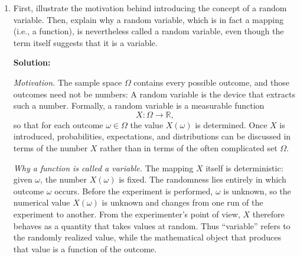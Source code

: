 \documentclass[11pt]{article}
\begin{document}
\noindent
{}

\vspace{1.2em}

\begin{enumerate}[label=\arabic*., leftmargin=1.6em]

\item First, illustrate the motivation behind introducing the concept of a random variable.
Then, explain why a random variable, which is in fact a mapping (i.e., a function), is
nevertheless called a random variable, even though the term itself suggests that it is a
variable.

\textbf{Solution:}

\textit{Motivation.}
The sample space \(\Omega\) contains every possible outcome, and those outcomes need not be numbers:
A random variable is the device that extracts such a number. Formally, a random variable is a measurable function
\[
X:\Omega\to\mathbb{R},
\]
so that for each outcome \(\omega\in\Omega\) the value \(X(\omega)\) is determined.
Once \(X\) is introduced, probabilities, expectations, and distributions can be discussed in terms of the number \(X\) rather than in terms of the often complicated set \(\Omega\).

\textit{Why a function is called a variable.}
The mapping \(X\) itself is deterministic: given \(\omega\), the number \(X(\omega)\) is fixed.
The randomness lies entirely in which outcome \(\omega\) occurs.
Before the experiment is performed, \(\omega\) is unknown, so the numerical value \(X(\omega)\) is unknown and changes from one run of the experiment to another.
From the experimenter's point of view, \(X\) therefore behaves as a quantity that takes values at random.
Thus ``variable'' refers to the randomly realized value, while the mathematical object that produces that value is a function of the outcome.


\end{enumerate}
\end{document}
